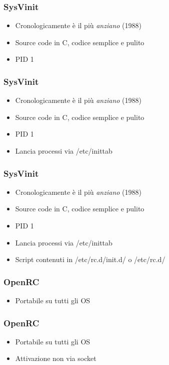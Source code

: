 \documentclass{beamer}
\begin{document}
\begin{frame}
	\frametitle{SysVinit}
	\begin{itemize}
    	\item Cronologicamente \`e il pi\`u \textit{anziano} (1988)
    	\item Source code in C, codice semplice e pulito
		\item PID 1
	\end{itemize}	
\end{frame}


\begin{frame}
\frametitle{SysVinit}
\begin{itemize}
	\item Cronologicamente \`e il pi\`u \textit{anziano} (1988)
	\item Source code in C, codice semplice e pulito
	\item PID 1
	\item Lancia processi via /etc/inittab
\end{itemize}	
\end{frame}


\begin{frame}
\frametitle{SysVinit}
\begin{itemize}
	\item Cronologicamente \`e il pi\`u \textit{anziano} (1988)
	\item Source code in C, codice semplice e pulito
	\item PID 1
	\item Lancia processi via /etc/inittab
	\item Script contenuti in /etc/rc.d/init.d/ o /etc/rc.d/
\end{itemize}	
\end{frame}


\begin{frame}
	\frametitle{OpenRC}
	\begin{itemize}
		\item Portabile su tutti gli OS
	\end{itemize}	 
\end{frame}



\begin{frame}
	\frametitle{OpenRC}
	\begin{itemize}
		\item Portabile su tutti gli OS
		\item Attivazione non via socket
	\end{itemize}	 
\end{frame}
\end{document}
